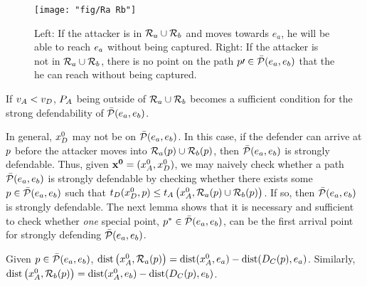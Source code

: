 \begin{figure}
\centering
\texttt{[image: "fig/Ra Rb"]}
\caption{Left: If the attacker is in $\mathcal{R}_a\cup\mathcal{R}_b$ and moves towards $e_a$, he  will be able to reach $e_a$ without being captured. Right: If the attacker is not in $\mathcal{R}_a\cup\mathcal{R}_b$, there is no point on the path $p\prime\in\bar{\mathcal{P}}(e_a,e_b)$ that the he can reach without being captured.}
\label{fig:lemma1}
\end{figure}

If $v_A<v_D$, $P_A$ being outside of $\mathcal{R}_a \cup \mathcal{R}_b$ becomes a sufficient condition for the strong defendability of $\bar{\mathcal{P}}(e_a,e_b)$.

In general, $x_D^0$ may not be on $\bar{\mathcal{P}}(e_a,e_b)$. In this case, if the defender can arrive at $p$ before the attacker moves into $\mathcal{R}_a(p)\cup\mathcal{R}_b(p)$, then $\bar{\mathcal{P}}(e_a,e_b)$ is strongly defendable. Thus, given $\mathbf{x^0} = (x_A^0,x_D^0)$, we may naively check whether a path $\bar{\mathcal{P}}(e_a,e_b)$ is strongly defendable by checking whether there exists some $p\in\bar{\mathcal{P}}(e_a,e_b)$ such that $t_D(x_D^0, p)\le t_A\left(x_A^0,\mathcal{R}_a(p)\cup\mathcal{R}_b(p)\right)$. If so, then $\bar{\mathcal{P}}(e_a,e_b)$ is strongly defendable. The next lemma shows that it is necessary and sufficient to check whether \textit{one} special point, $p^*\in\bar{\mathcal{P}}(e_a,e_b)$, can be the first arrival point for strongly defending $\bar{\mathcal{P}}(e_a,e_b)$.

\begin{rem} \label{rem:time_to_region_a}
Given $p\in\bar{\mathcal{P}}(e_a,e_b)$, $\text{dist}\left(x_A^0,\mathcal{R}_a(p)\right) = \text{dist}(x_A^0,e_a) - \text{dist}(D_C(p),e_a)$. Similarly, $\text{dist}\left(x_A^0,\mathcal{R}_b(p)\right) = \text{dist}(x_A^0,e_b) - \text{dist}(D_C(p),e_b)$.
\end{rem}

